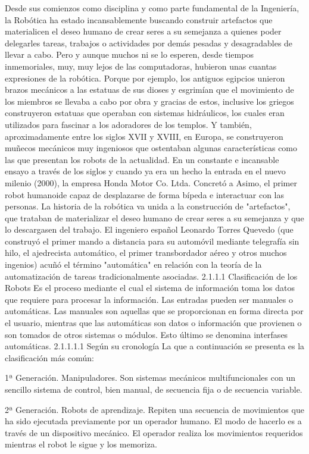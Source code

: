 Desde sus comienzos como disciplina y como parte fundamental de la Ingeniería, la Robótica ha estado incansablemente buscando construir artefactos que materialicen el deseo humano de crear seres a su semejanza a quienes poder delegarles tareas, trabajos o actividades por demás pesadas y desagradables de llevar a cabo. Pero y aunque muchos ni se lo esperen, desde tiempos inmemoriales, muy, muy lejos de las computadoras, hubieron unas cuantas expresiones de la robótica. Porque por ejemplo, los antiguos egipcios unieron brazos mecánicos a las estatuas de sus dioses y esgrimían que el movimiento de los miembros se llevaba a cabo por obra y gracias de estos, inclusive los griegos construyeron estatuas que operaban con sistemas hidráulicos, los cuales eran utilizados para fascinar a los adoradores de los templos.
Y también, aproximadamente entre los siglos XVII y XVIII, en Europa, se construyeron muñecos mecánicos muy ingeniosos que ostentaban algunas características  como las que presentan los robots de la actualidad. En un constante e incansable ensayo a través de los siglos y cuando ya era un hecho la entrada en el nuevo milenio (2000), la empresa Honda Motor Co. Ltda. Concretó a Asimo, el primer robot humanoide capaz de desplazarse de forma bípeda e interactuar con las personas.
La historia de la robótica va unida a la construcción de "artefactos", que trataban de materializar el deseo humano de crear seres a su semejanza y que lo descargasen del trabajo. El ingeniero español Leonardo Torres Quevedo (que construyó el primer mando a distancia para su automóvil mediante telegrafía sin hilo, el ajedrecista automático, el primer transbordador aéreo y otros muchos ingenios) acuñó el término "automática" en relación con la teoría de la automatización de tareas tradicionalmente asociadas.
2.1.1.1	Clasificación de los Robots
Es el proceso mediante el cual el sistema de información toma los datos que requiere para procesar la información. Las entradas pueden ser manuales o automáticas. Las manuales son aquellas que se proporcionan en forma directa por el usuario, mientras que las automáticas son datos o información que provienen o son tomados de otros sistemas o módulos. Esto último se denomina interfases automáticas. 
2.1.1.1.1	Según su cronología
La que a continuación se presenta es la clasificación más común:

1ª Generación.
Manipuladores. Son sistemas mecánicos multifuncionales con un sencillo sistema de control, bien manual, de secuencia fija o de secuencia variable.

2ª Generación.
Robots de aprendizaje. Repiten una secuencia de movimientos que ha sido ejecutada previamente por un operador humano. El modo de hacerlo es a través de un dispositivo mecánico. El operador realiza los movimientos requeridos mientras el robot le sigue y los memoriza.


